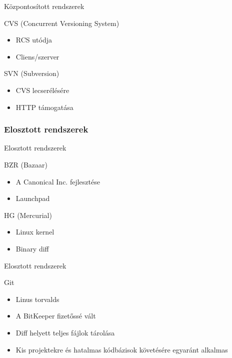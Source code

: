 \documentclass[display,t]{beamer}
\begin{document}
\begin{frame}{Központosított rendszerek}
    \pause
    \begin{block}{CVS (Concurrent Versioning System)}
        \begin{itemize}
            \pause \item RCS utódja
            \pause \item Cliens/szerver
        \end{itemize}
    \end{block}
    \pause
    \begin{block}{SVN (Subversion)}
        \begin{itemize}
            \pause \item CVS lecserélésére
            \pause \item HTTP támogatása
        \end{itemize}
    \end{block}
\end{frame}

\subsubsection{Elosztott rendszerek}

\begin{frame}{Elosztott rendszerek}
    \pause
    \begin{block}{BZR (Bazaar)}
        \begin{itemize}
            \pause \item A Canonical Inc. fejlesztése
            \pause \item Launchpad
        \end{itemize}
    \end{block}
    \pause
    \begin{block}{HG (Mercurial)}
        \begin{itemize}
            \pause \item Linux kernel
            \pause \item Binary diff
        \end{itemize}
    \end{block}
\end{frame}

\begin{frame}{Elosztott rendszerek}
    \pause
    \begin{block}{Git}
        \begin{itemize}
            \pause \item Linus torvalds
            \pause \item A BitKeeper fizetőssé vált
            \pause \item Diff helyett teljes fájlok tárolása
            \pause \item Kis projektekre és hatalmas kódbázisok követésére egyaránt alkalmas
        \end{itemize}
    \end{block}
\end{frame}
\end{document}
